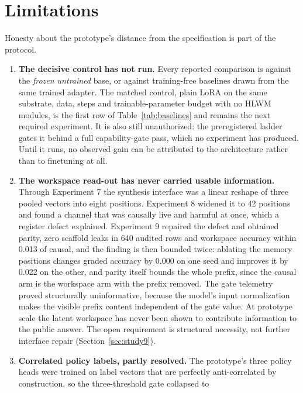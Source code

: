 \documentclass[10pt,a4paper]{article}
\begin{document}
\section{Limitations}
\label{sec:limits}

Honesty about the prototype's distance from the specification is part of the
protocol.

\begin{enumerate}[label=\arabic*.]
\item \textbf{The decisive control has not run.} Every reported comparison is
  against the \emph{frozen untrained} base, or against training-free
  baselines drawn from the same trained adapter. The matched control, plain
  LoRA on the same substrate, data, steps and trainable-parameter budget with
  no HLWM modules, is the first row of Table~\ref{tab:baselines} and remains
  the next required experiment. It is also still unauthorized: the
  preregistered ladder gates it behind a full capability-gate pass, which no
  experiment has produced. Until it runs, no observed gain can be attributed to
  the architecture rather than to finetuning at all.
\item \textbf{The workspace read-out has never carried usable information.}
  Through Experiment 7 the synthesis interface was a linear reshape of three
  pooled vectors into eight positions. Experiment 8 widened it to 42 positions and
  found a channel that was causally live and harmful at once, which a
  register defect explained. Experiment 9 repaired the defect and obtained parity,
  zero scaffold leaks in 640 audited rows and workspace accuracy within 0.013
  of causal, and the finding is then bounded twice: ablating the memory
  positions changes graded accuracy by 0.000 on one seed and improves it by
  0.022 on the other, and parity itself bounds the whole prefix, since the
  causal arm is the workspace arm with the prefix removed. The gate telemetry
  proved structurally uninformative, because the model's input normalization
  makes the visible prefix content independent of the gate value. At
  prototype scale the latent workspace has never been
  shown to contribute information to the public answer. The open requirement
  is structural necessity, not further interface repair
  (Section~\ref{sec:study9}).
\item \textbf{Correlated policy labels, partly resolved.} The prototype's
  three policy heads were trained on label vectors that are perfectly
  anti-correlated by construction, so the three-threshold gate collapsed to

\end{enumerate}
\end{document}
